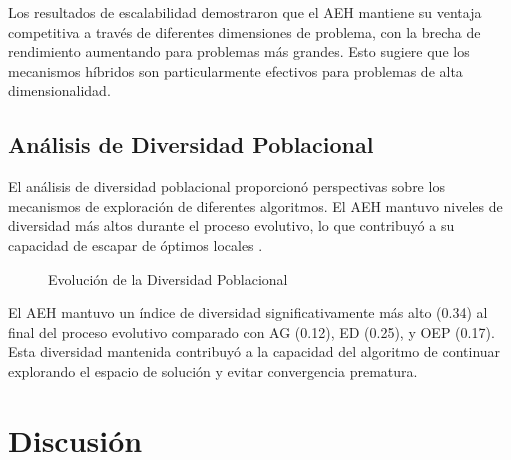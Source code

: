 \documentclass[10pt,a4paper]{article}
\begin{document}
Los resultados de escalabilidad demostraron que el AEH mantiene su ventaja competitiva a través de diferentes dimensiones de problema, con la brecha de rendimiento aumentando para problemas más grandes. Esto sugiere que los mecanismos híbridos son particularmente efectivos para problemas de alta dimensionalidad.


\subsection{Análisis de Diversidad Poblacional}

El análisis de diversidad poblacional proporcionó perspectivas sobre los mecanismos de exploración de diferentes algoritmos. El AEH mantuvo niveles de diversidad más altos durante el proceso evolutivo, lo que contribuyó a su capacidad de escapar de óptimos locales .

\begin{figure}[H]
\centering
{}
\caption{Evolución de la Diversidad Poblacional}
\label{fig:diversity}
\end{figure}

El AEH mantuvo un índice de diversidad significativamente más alto (0.34) al final del proceso evolutivo comparado con AG (0.12), ED (0.25), y OEP (0.17). Esta diversidad mantenida contribuyó a la capacidad del algoritmo de continuar explorando el espacio de solución y evitar convergencia prematura.

\section{Discusión}
\end{document}
